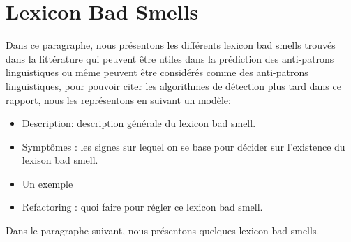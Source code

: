 \section{Lexicon Bad Smells }
\label{lbs}
Dans ce paragraphe, nous présentons les différents lexicon bad smells trouvés dans la littérature qui peuvent être utiles dans la prédiction des anti-patrons linguistiques ou même peuvent être considérés comme des anti-patrons linguistiques, pour pouvoir citer les algorithmes de détection plus tard dans ce rapport, nous les représentons en suivant un modèle\cite{abebe2009lexicon}:
\begin{itemize}
    \item Description: description générale du lexicon bad smell.
    \item Symptômes : les signes sur lequel on se base pour décider sur l'existence du lexison bad smell.
    \item Un exemple
    \item Refactoring : quoi faire pour régler ce lexicon bad smell.
\end{itemize}
\newline
Dans le paragraphe suivant, nous présentons quelques lexicon bad smells\cite{abebe2012can}.
